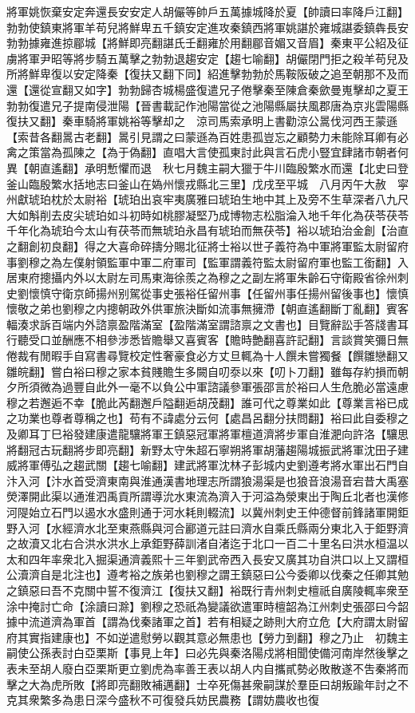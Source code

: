 將軍姚恢棄安定奔還長安安定人胡儼等帥戶五萬據城降於夏【帥讀曰率降戶江翻】勃勃使鎮東將軍羊苟兒將鮮卑五千鎮安定進攻秦鎮西將軍姚諶於雍城諶委鎮犇長安勃勃據雍進掠郿城【將鮮即亮翻諶氏壬翻雍於用翻郿音媚又音眉】秦東平公紹及征虜將軍尹昭等將步騎五萬擊之勃勃退趨安定【趨七喻翻】胡儼閉門拒之殺羊苟兒及所將鮮卑復以安定降秦【復扶又翻下同】紹進擊勃勃於馬鞍阪破之追至朝那不及而還【還從宣翻又如字】勃勃歸杏城楊盛復遣兄子倦擊秦至陳倉秦歛曼嵬擊却之夏王勃勃復遣兄子提南侵泄陽【晉書載記作池陽當從之池陽縣屬扶風郡唐為京兆雲陽縣復扶又翻】秦車騎將軍姚裕等擊却之　涼司馬索承明上書勸涼公暠伐河西王蒙遜【索昔各翻暠古老翻】暠引見謂之曰蒙遜為百姓患孤豈忘之顧勢力未能除耳卿有必禽之策當為孤陳之【為于偽翻】直唱大言使孤東討此與言石虎小豎宜肆諸市朝者何異【朝直遙翻】承明慙懼而退　秋七月魏主嗣大獵于牛川臨殷繁水而還【北史曰登釜山臨殷繁水括地志曰釜山在媯州懷戎縣北三里】戊戌至平城　八月丙午大赦　寜州獻琥珀枕於太尉裕【琥珀出哀牢夷廣雅曰琥珀生地中其上及旁不生草深者八九尺大如斛削去皮尖琥珀如斗初時如桃膠凝堅乃成博物志松脂淪入地千年化為茯苓茯苓千年化為琥珀今太山有茯苓而無琥珀永昌有琥珀而無茯苓】裕以琥珀治金創【治直之翻創初良翻】得之大喜命碎擣分賜北征將士裕以世子義符為中軍將軍監太尉留府事劉穆之為左僕射領監軍中軍二府軍司【監軍謂義符監太尉留府軍也監工銜翻】入居東府摠攝内外以太尉左司馬東海徐羨之為穆之之副左將軍朱齡石守衛殿省徐州刺史劉懷慎守衛京師揚州别駕從事史張裕任留州事【任留州事任揚州留後事也】懷慎懷敬之弟也劉穆之内摠朝政外供軍旅決斷如流事無擁滯【朝直遙翻斷丁亂翻】賓客輻湊求訴百端内外諮禀盈階滿室【盈階滿室謂諮禀之文書也】目覽辭訟手答牋書耳行聽受口並酬應不相參涉悉皆贍舉又喜賓客【贍時艶翻喜許記翻】言談賞笑彌日無倦裁有閒暇手自寫書尋覽校定性奢豪食必方丈旦輒為十人饌未嘗獨餐【饌雛戀翻又雛皖翻】嘗白裕曰穆之家本貧賤贍生多闕自叨沗以來【叨卜刀翻】雖每存約損而朝夕所須微為過豐自此外一毫不以負公中軍諮議參軍張邵言於裕曰人生危脆必當遠慮穆之若邂逅不幸【脆此芮翻邂戶隘翻逅胡茂翻】誰可代之尊業如此【尊業言裕已成之功業也尊者尊稱之也】苟有不諱處分云何【處昌呂翻分扶問翻】裕曰此自委穆之及卿耳丁巳裕發建康遣龍驤將軍王鎮惡冠軍將軍檀道濟將步軍自淮淝向許洛【驤思將翻冠古玩翻將步即亮翻】新野太守朱超石寧朔將軍胡藩趨陽城振武將軍沈田子建威將軍傅弘之趨武關【趨七喻翻】建武將軍沈林子彭城内史劉遵考將水軍出石門自汴入河【汴水首受濟東南與淮通漢書地理志所謂狼湯渠是也狼音浪湯音宕昔大禹塞熒澤開此渠以通淮泗禹貢所謂導沇水東流為濟入于河溢為滎東出于陶丘北者也漢修河隄始立石門以遏水水盛則通于河水耗則輟流】以冀州刺史王仲德督前鋒諸軍開鉅野入河【水經濟水北至東燕縣與河合酈道元註曰濟水自乘氏縣兩分東北入于鉅野濟之故瀆又北右合洪水洪水上承鉅野薛訓渚自渚迄于北口一百二十里名曰洪水桓温以太和四年率衆北入掘渠通濟義熙十三年劉武帝西入長安又廣其功自洪口以上又謂桓公瀆濟自是北注也】遵考裕之族弟也劉穆之謂王鎮惡曰公今委卿以伐秦之任卿其勉之鎮惡曰吾不克關中誓不復濟江【復扶又翻】裕既行青州刺史檀祇自廣陵輒率衆至涂中掩討亡命【涂讀曰滁】劉穆之恐祇為變議欲遣軍時檀韶為江州刺史張邵曰今韶據中流道濟為軍首【謂為伐秦諸軍之首】若有相疑之跡則大府立危【大府謂太尉留府其實指建康也】不如逆遣慰勞以觀其意必無患也【勞力到翻】穆之乃止　初魏主嗣使公孫表討白亞栗斯【事見上年】曰必先與秦洛陽戍將相聞使備河南岸然後擊之表未至胡人廢白亞栗斯更立劉虎為率善王表以胡人内自攜貳勢必敗散遂不吿秦將而擊之大為虎所敗【將即亮翻敗補邁翻】士卒死傷甚衆嗣謀於羣臣曰胡叛踰年討之不克其衆繁多為患日深今盛秋不可復發兵妨民農務【謂妨農收也復